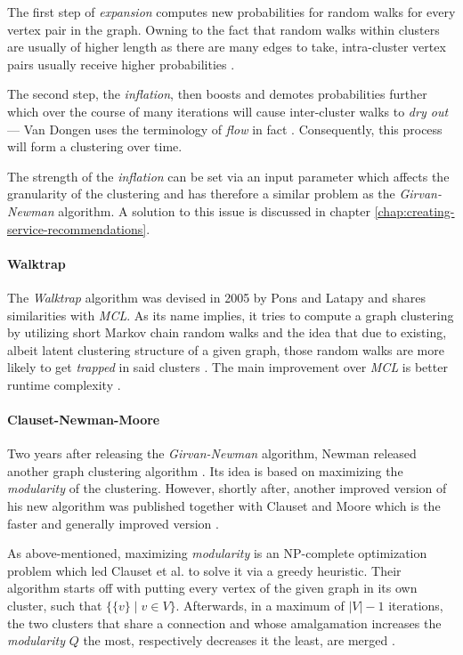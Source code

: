 \documentclass[12pt,a4paper]{report}
\begin{document}
The first step of \textit{expansion} computes new probabilities for random walks
for every vertex pair in the graph. Owning to the fact that random walks within
clusters are usually of higher length as there are many edges to take, intra-cluster
vertex pairs usually receive higher probabilities \cite{vandongen2000graph}.

The second step, the \textit{inflation}, then boosts and demotes probabilities
further which over the course of many iterations will cause inter-cluster walks
to \textit{dry out} --- Van Dongen uses the terminology of \textit{flow} in fact
\cite{vandongen2000graph}. Consequently, this process will form a clustering
over time.

The strength of the \textit{inflation} can be set via an input parameter which
affects the granularity of the clustering and has therefore a similar problem
as the \textit{Girvan-Newman} algorithm. A solution to this issue is discussed
in chapter \ref{chap:creating-service-recommendations}.

\paragraph{Walktrap \cite{pons2005computing}}
The \textit{Walktrap} algorithm was devised in 2005 by Pons and Latapy
\cite{pons2005computing} and shares similarities with \textit{MCL}.
As its name implies, it tries to compute a graph clustering by utilizing short
Markov chain random walks and the idea that due to existing, albeit latent
clustering structure of a given graph, those random walks are more likely
to get \textit{trapped} in said clusters \cite{pons2005computing}.
The main improvement over \textit{MCL} is better runtime complexity
\cite{pons2005computing}.

\paragraph{Clauset-Newman-Moore \cite{clauset2004modularity}}
Two years after releasing the \textit{Girvan-Newman} algorithm, Newman
released another graph clustering algorithm \cite{newman2004fast}.
Its idea is based on maximizing the \textit{modularity} of the clustering.
However, shortly after, another improved version of his new algorithm
was published together with Clauset and Moore which is the
faster and generally improved version \cite{clauset2004modularity}.

As above-mentioned, maximizing \textit{modularity} is an NP-complete
optimization problem which led Clauset et al. to solve it via a greedy heuristic.
Their algorithm starts off with putting every vertex of the given graph in its
own cluster, such that \(\{\{v\} \mid v \in V\}\).
Afterwards, in a maximum of \(\vert V \vert - 1\) iterations, the two clusters
that share a connection and whose amalgamation increases the \textit{modularity}
\(Q\) the most, respectively decreases it the least, are merged
\cite{clauset2004modularity}.
\end{document}
